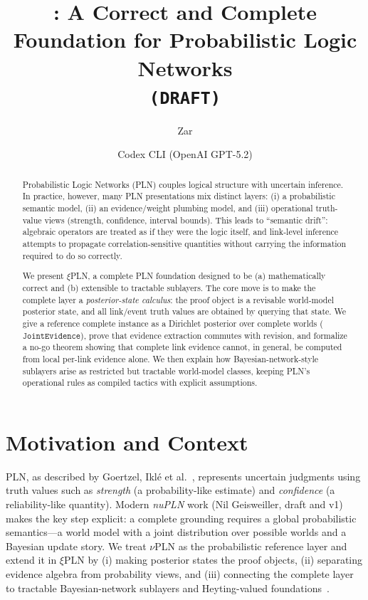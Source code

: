 \documentclass[]{article}
\title{\xiPLN: A Correct and Complete Foundation for Probabilistic Logic Networks\\
  \texttt{(DRAFT)}}
\author{Zar \and Codex CLI (OpenAI GPT-5.2)}
\newcommand{\nuPLN}{\texorpdfstring{$\nu$}{nu}\textup{PLN}}
\newcommand{\xiPLN}{\texorpdfstring{$\xi$}{xi}\textup{PLN}}
\newcommand{\ty}[1]{\ensuremath{\mathtt{#1}}}
\newcommand{\JointEvidence}{\ty{JointEvidence}}
\begin{document}
\maketitle

\begin{abstract}
Probabilistic Logic Networks (PLN) couples logical structure with uncertain inference.
In practice, however, many PLN presentations mix distinct layers: (i) a probabilistic
semantic model, (ii) an evidence/weight plumbing model, and (iii) operational truth-value
views (strength, confidence, interval bounds).
This leads to ``semantic drift'': algebraic operators are treated as if they were the
logic itself, and link-level inference attempts to propagate correlation-sensitive
quantities without carrying the information required to do so correctly.

We present \xiPLN{}, a complete PLN foundation designed to be (a) mathematically correct
and (b) extensible to tractable sublayers.  The core move is to make the complete layer a
\emph{posterior-state calculus}: the proof object is a revisable world-model posterior
state, and all link/event truth values are obtained by querying that state.
We give a reference complete instance as a Dirichlet posterior over complete worlds
(\JointEvidence{}), prove that evidence extraction commutes with revision, and formalize a
no-go theorem showing that complete link evidence cannot, in general, be computed from local
per-link evidence alone.  We then explain how Bayesian-network-style sublayers arise as
restricted but tractable world-model classes, keeping PLN's operational rules as compiled
tactics with explicit assumptions.
\end{abstract}

\section{Motivation and Context}

PLN, as described by Goertzel, Ikl\'{e} et al.~\cite{goertzel2009pln}, represents uncertain
judgments using truth values such as
\emph{strength} (a probability-like estimate) and \emph{confidence} (a reliability-like
quantity).  Modern \emph{nuPLN} work (Nil Geisweiller, draft and v1) makes the key step
explicit: a complete grounding requires a global probabilistic semantics---a world model
with a joint distribution over possible worlds and a Bayesian update story.
We treat \nuPLN{} as the probabilistic reference layer and extend it in \xiPLN{} by (i)
making posterior states the proof objects, (ii) separating evidence algebra from probability
views, and (iii) connecting the complete layer to tractable Bayesian-network sublayers and
Heyting-valued foundations~\cite{nuPLN2026}.
\end{document}
